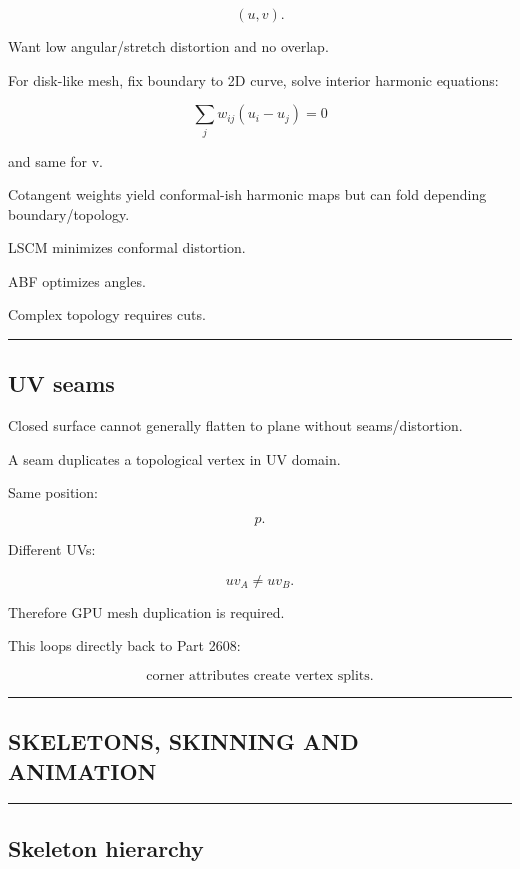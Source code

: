 \[
(u,v).
\]

Want low angular/stretch distortion and no overlap.

For disk-like mesh, fix boundary to 2D curve, solve interior harmonic equations:

\[
\boxed{
\sum_j
w_{ij}
(u_i-u_j)=0
}
\]

and same for v.

Cotangent weights yield conformal-ish harmonic maps but can fold depending boundary/topology.

LSCM minimizes conformal distortion.

ABF optimizes angles.

Complex topology requires cuts.

\begin{center}\rule{0.5\linewidth}{0.5pt}\end{center}

\subsection{UV seams}\label{04-visual-computing-ii-ch041-uv-seams}

Closed surface cannot generally flatten to plane without seams/distortion.

A seam duplicates a topological vertex in UV domain.

Same position:

\[
p.
\]

Different UVs:

\[
uv_A\ne uv_B.
\]

Therefore GPU mesh duplication is required.

This loops directly back to Part 2608:

\[
\boxed{
\text{corner attributes create vertex splits}.
}
\]

\begin{center}\rule{0.5\linewidth}{0.5pt}\end{center}

\subsection{SKELETONS, SKINNING AND ANIMATION}\label{04-visual-computing-ii-ch041-skeletons-skinning-and-animation}

\begin{center}\rule{0.5\linewidth}{0.5pt}\end{center}

\subsection{Skeleton hierarchy}\label{04-visual-computing-ii-ch041-skeleton-hierarchy}

